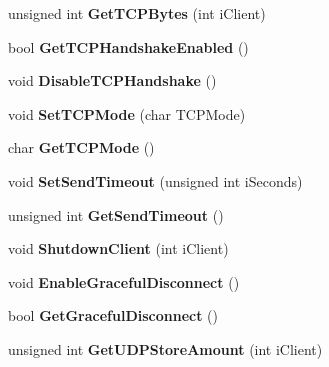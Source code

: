 \begin{DoxyCompactItemize}
\item 
\hypertarget{classcl_instance_a15925e19fac54e5c0a40e7d7ff1f8aff}{
unsigned int {\bfseries GetTCPBytes} (int iClient)}
\label{classcl_instance_a15925e19fac54e5c0a40e7d7ff1f8aff}

\item 
\hypertarget{classcl_instance_a472d397eae38b86fbab930e12fb5e183}{
bool {\bfseries GetTCPHandshakeEnabled} ()}
\label{classcl_instance_a472d397eae38b86fbab930e12fb5e183}

\item 
\hypertarget{classcl_instance_aec361e5eda924347ae47532b89fe4206}{
void {\bfseries DisableTCPHandshake} ()}
\label{classcl_instance_aec361e5eda924347ae47532b89fe4206}

\item 
\hypertarget{classcl_instance_a8506e6ce9a4e4847d171d8d6f4a1a8e9}{
void {\bfseries SetTCPMode} (char TCPMode)}
\label{classcl_instance_a8506e6ce9a4e4847d171d8d6f4a1a8e9}

\item 
\hypertarget{classcl_instance_a746910151540b11652ab2ca9a71efc25}{
char {\bfseries GetTCPMode} ()}
\label{classcl_instance_a746910151540b11652ab2ca9a71efc25}

\item 
\hypertarget{classcl_instance_acff16f3211dfc774bd142dc867f25162}{
void {\bfseries SetSendTimeout} (unsigned int iSeconds)}
\label{classcl_instance_acff16f3211dfc774bd142dc867f25162}

\item 
\hypertarget{classcl_instance_ae3bef314dac215cba668894c2b59c81e}{
unsigned int {\bfseries GetSendTimeout} ()}
\label{classcl_instance_ae3bef314dac215cba668894c2b59c81e}

\item 
\hypertarget{classcl_instance_aa28e7201fb080c33f5ddd7793ece3f62}{
void {\bfseries ShutdownClient} (int iClient)}
\label{classcl_instance_aa28e7201fb080c33f5ddd7793ece3f62}

\item 
\hypertarget{classcl_instance_a606a19447645e4ddb128dd32142acffb}{
void {\bfseries EnableGracefulDisconnect} ()}
\label{classcl_instance_a606a19447645e4ddb128dd32142acffb}

\item 
\hypertarget{classcl_instance_aec8cbfbcbf56099bd479198785de2ee9}{
bool {\bfseries GetGracefulDisconnect} ()}
\label{classcl_instance_aec8cbfbcbf56099bd479198785de2ee9}

\item 
\hypertarget{classcl_instance_ab1b3ac5a7e5b5fdd2ee85d8d02bb0ceb}{
unsigned int {\bfseries GetUDPStoreAmount} (int iClient)}
\label{classcl_instance_ab1b3ac5a7e5b5fdd2ee85d8d02bb0ceb}


\end{DoxyCompactItemize}
